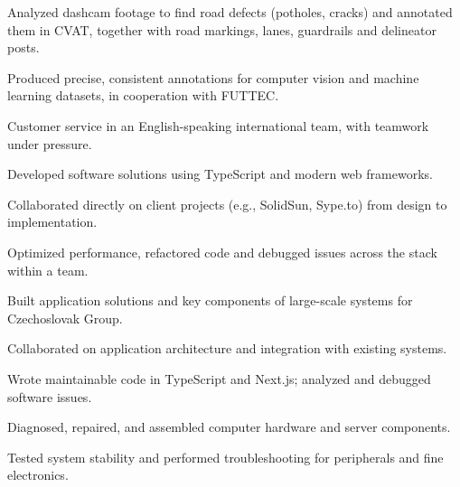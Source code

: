 \documentclass[10pt,a4paper]{article}
\begin{document}
\begin{cvlist}
  \item Analyzed dashcam footage to find road defects (potholes, cracks) and annotated them in CVAT, together with road markings, lanes, guardrails and delineator posts.
  \item Produced precise, consistent annotations for computer vision and machine learning datasets, in cooperation with FUTTEC.
\end{cvlist}

\begin{cvlist}
  \item Customer service in an English-speaking international team, with teamwork under pressure.
\end{cvlist}

\newpage
{}
\begin{cvlist}
  \item Developed software solutions using TypeScript and modern web frameworks.
  \item Collaborated directly on client projects (e.g., SolidSun, Sype.to) from design to implementation.
  \item Optimized performance, refactored code and debugged issues across the stack within a team.
\end{cvlist}

\begin{cvlist}
  \item Built application solutions and key components of large-scale systems for Czechoslovak Group.
  \item Collaborated on application architecture and integration with existing systems.
  \item Wrote maintainable code in TypeScript and Next.js; analyzed and debugged software issues.
\end{cvlist}

\begin{cvlist}
  \item Diagnosed, repaired, and assembled computer hardware and server components.
  \item Tested system stability and performed troubleshooting for peripherals and fine electronics.
\end{cvlist}
\end{document}
